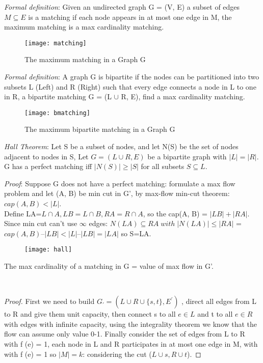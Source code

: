 \emph{Formal definition}: Given an undirected graph G = (V, E) a subset of edges $M \subseteq E$ is a matching if each node appears in at most one edge in M, the maximum matching is a max cardinality matching.

\begin{figure}[H]
    \centering
    \texttt{[image: matching]}
    \caption{The maximum matching in a Graph G}
\end{figure}

\emph{Formal definition}: A graph G is bipartite if the nodes can be partitioned into two subsets L (Left) and R (Right) such that every edge connects a node in L to one in R, a bipartite matching G = (L $\cup$ R, E), find a max cardinality matching.

\begin{figure}[H]
    \centering
    \texttt{[image: bmatching]}
    \caption{The maximum bipartite matching in a Graph G}
\end{figure}


\emph{Hall Theorem}: Let S be a subset of nodes, and let N(S) be the set of nodes adjacent to nodes in S, Let $G = (L \cup R, E)$ be a bipartite graph with $|L| = |R|$. G has a perfect matching iff $|N(S)| \geq |S|$ for all subsets $S \subseteq L$.\\

\clearpage

\emph{Proof}: Suppose G does not have a perfect matching: formulate a max flow problem and let (A, B) be min cut in G', by max-flow min-cut theorem: $cap(A, B) < | L |$.\\
Define LA=$L\cap A, LB=L \cap B, RA=R \cap A$, so the cap(A, B) = $| LB | + | RA |$. Since min cut can't use $\infty$ edges: $N(LA) \subseteq RA \; with \; |N(LA)| \leq |RA|$ = $cap(A,B) – |LB| < |L| – |LB| = |LA|$ so S=LA.

\begin{figure}[H]
    \centering
    \texttt{[image: hall]}
    \caption{}
\end{figure}


\begin{claim}
    The max cardinality of a matching in G = value of max flow in G'.
\end{claim}\\

\begin{proof}
    First we need to build $G_{'} = (L \cup R \cup \{s, t\}, E^{'} )$ , direct all edges from L to R and give them unit capacity, then connect s to all $e \in L$ and t to all $e \in R$ with edges with infinite capacity, using the integrality theorem we know that the flow can assume only value 0-1. Finally consider the set of edges from L to R with f (e) = 1, each node in L and R participates in at most one edge in M, with with f (e) = 1 so $| M | = k$: considering the  cut ($L \cup s, R \cup t$).
\end{proof}

